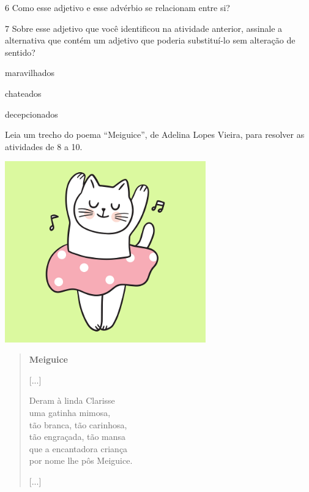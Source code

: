 \num{6} Como esse adjetivo e esse advérbio se relacionam entre si?


\num{7} Sobre esse adjetivo que você identificou na atividade anterior, assinale a alternativa que contém um adjetivo que poderia substituí-lo sem alteração de sentido?

\begin{boxlist}
 maravilhados

 chateados

 decepcionados
\end{boxlist}

Leia um trecho do poema ``Meiguice'', de Adelina Lopes Vieira, para resolver as atividades de 8 a 10.

\includegraphics[width=3.41667in,height=3.07500in]{./media/image23.png}

\begin{verse}
\textbf{Meiguice}

{[}...{]}

Deram à linda Clarisse\\
uma gatinha mimosa,\\
tão branca, tão carinhosa,\\
tão engraçada, tão mansa\\
que a encantadora criança\\
por nome lhe pôs Meiguice.

{[}...{]}
\end{verse}


